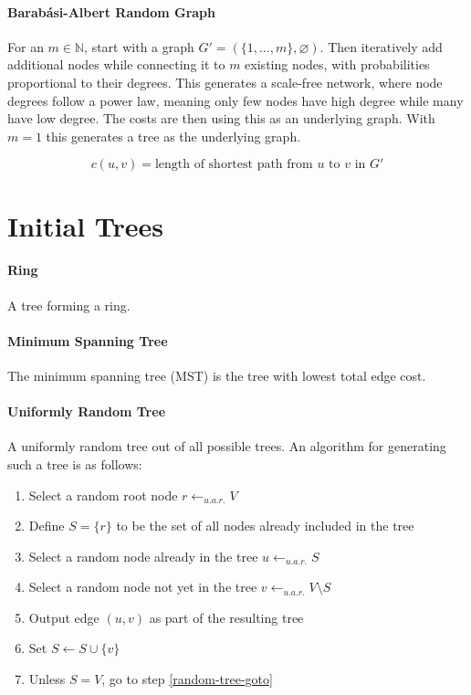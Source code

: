 \documentclass[a4paper, oneside]{discothesis}
\begin{document}
\paragraph{Barabási-Albert Random Graph} For an $m\in\mathbb{N}$, start with a graph $G'=(\{1,\dots,m\},\varnothing)$. Then iteratively add additional nodes while connecting it to $m$ existing nodes, with probabilities proportional to their degrees. This generates a scale-free network, where node degrees follow a power law, meaning only few nodes have high degree while many have low degree. The costs are then using this as an underlying graph. With $m=1$ this generates a tree as the underlying graph.

\begin{equation}
c(u,v)=\text{length of shortest path from $u$ to $v$ in $G'$}
\end{equation}

\section{Initial Trees}

\paragraph{Ring}

A tree forming a ring.

\paragraph{Minimum Spanning Tree}

The minimum spanning tree (MST) is the tree with lowest total edge cost.

\paragraph{Uniformly Random Tree}

A uniformly random tree out of all possible trees. An algorithm for generating such a tree is as follows:
\begin{enumerate}
\item Select a random root node $r\gets_{u.a.r.}V$
\item Define $S=\{r\}$ to be the set of all nodes already included in the tree
\item Select a random node already in the tree $u\gets_{u.a.r.}S$
\label{random-tree-goto}
\item Select a random node not yet in the tree $v\gets_{u.a.r.}V\setminus S$
\item Output edge $(u,v)$ as part of the resulting tree
\item Set $S\gets S\cup\{v\}$
\item Unless $S=V$, go to step \ref{random-tree-goto}
\end{enumerate}
\end{document}
